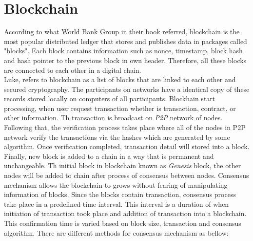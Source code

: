 \section{Blockchain} According to what World Bank Group in their book referred, blockchain is the most popular distributed ledger that stores and publishes data in packages called "blocks". Each block contains information such as nonce, timestamp, block hash and hash pointer to the previous block in own header. Therefore, all these blocks are connected to each other in a digital chain\cite{DLT}. \\
Luke\cite{Luke}, refers to blockchain as a list of blocks that are linked to each other and secured cryptography. The participants on networks have a identical copy of these records stored locally on computers of all participants. Blockhain start processing, when  user request transaction whether is transaction, contract, or other information. Th transaction is broadcast on \textit{P2P} network of nodes. Following that, the verification process takes place where all of the nodes in P2P network verify the transactions via the hashes which are  generated by some algorithm. Once verification completed, transaction detail will stored into a block. Finally, new block is added to a chain in a way that is permanent and unchangeable\cite{Luke}. Th initial block in blockchain known as \textit{Genesis} block, the other nodes will be added to chain after process of consensus between nodes. Consensus mechanism allows the blockchain to grows without  fearing of manipulating information of blocks. Since the blocks contain transaction, consensus process take place in a predefined time interval. This interval is a duration of when initiation of transaction took place and addition of transaction into a blockchain. This confirmation time is varied based on block size, transaction and consensus algorithm. There are different methods for consensus mechanism as bellow: 
